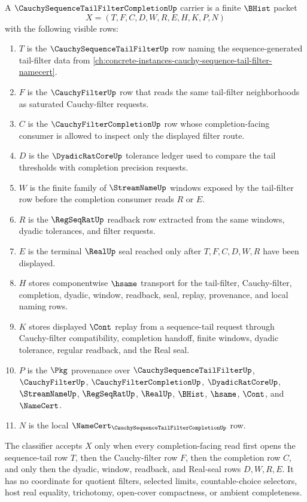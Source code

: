 \begin{definition}
\label{def:cauchy-sequence-tail-filter-completion-carrier}
A $\CauchySequenceTailFilterCompletionUp$ carrier is a finite $\BHist$ packet
$$
X=(T,F,C,D,W,R,E,H,K,P,N)
$$
with the following visible rows:
\begin{enumerate}
\item $T$ is the $\CauchySequenceTailFilterUp$ row naming the sequence-generated tail-filter data from \autoref{ch:concrete-instances-cauchy-sequence-tail-filter-namecert}.
\item $F$ is the $\CauchyFilterUp$ row that reads the same tail-filter neighborhoods as saturated Cauchy-filter requests.
\item $C$ is the $\CauchyFilterCompletionUp$ row whose completion-facing consumer is allowed to inspect only the displayed filter route.
\item $D$ is the $\DyadicRatCoreUp$ tolerance ledger used to compare the tail thresholds with completion precision requests.
\item $W$ is the finite family of $\StreamNameUp$ windows exposed by the tail-filter row before the completion consumer reads $R$ or $E$.
\item $R$ is the $\RegSeqRatUp$ readback row extracted from the same windows, dyadic tolerances, and filter requests.
\item $E$ is the terminal $\RealUp$ seal reached only after $T,F,C,D,W,R$ have been displayed.
\item $H$ stores componentwise $\hsame$ transport for the tail-filter, Cauchy-filter, completion, dyadic, window, readback, seal, replay, provenance, and local naming rows.
\item $K$ stores displayed $\Cont$ replay from a sequence-tail request through Cauchy-filter compatibility, completion handoff, finite windows, dyadic tolerance, regular readback, and the Real seal.
\item $P$ is the $\Pkg$ provenance over $\CauchySequenceTailFilterUp$, $\CauchyFilterUp$, $\CauchyFilterCompletionUp$, $\DyadicRatCoreUp$, $\StreamNameUp$, $\RegSeqRatUp$, $\RealUp$, $\BHist$, $\hsame$, $\Cont$, and $\NameCert$.
\item $N$ is the local $\NameCert_{\CauchySequenceTailFilterCompletionUp}$ row.
\end{enumerate}
The classifier accepts $X$ only when every completion-facing read first opens the sequence-tail row $T$, then the Cauchy-filter row $F$, then the completion row $C$, and only then the dyadic, window, readback, and Real-seal rows $D,W,R,E$. It has no coordinate for quotient filters, selected limits, countable-choice selectors, host real equality, trichotomy, open-cover compactness, or ambient completeness.
\end{definition}

